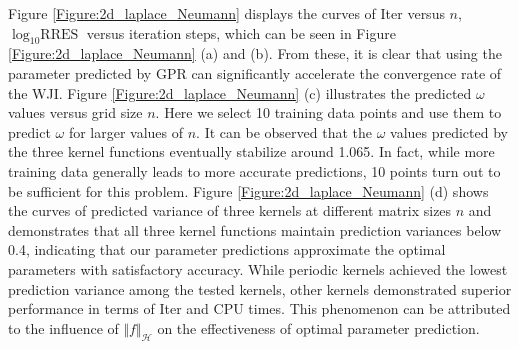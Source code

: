 \documentclass[preprint,review,sort&compress,3p]{elsarticle}
\begin{document}
Figure \ref{Figure:2d_laplace_Neumann} displays the curves of Iter versus $n$, $\log_{10} \text{RRES}$ versus iteration steps, which can be seen in Figure \ref{Figure:2d_laplace_Neumann} (a) and (b). {  From these, it is clear that using the parameter predicted by GPR can significantly accelerate the convergence rate of the WJI. Figure \ref{Figure:2d_laplace_Neumann} (c) illustrates the predicted $\omega$ values versus grid size $n$. Here we select 10 training data points and use them to predict $\omega$ for larger values of $n$. It can be observed that the $\omega$ values predicted by the three kernel functions eventually stabilize around 1.065. In fact, while more training data generally leads to more accurate predictions, 10 points turn out to be sufficient for this problem.}  Figure \ref{Figure:2d_laplace_Neumann} (d) shows the curves of predicted variance of three kernels at different matrix sizes $n$ and demonstrates that all three kernel functions maintain prediction variances below 0.4, indicating that our parameter predictions approximate the optimal parameters with satisfactory accuracy.
While periodic kernels achieved the lowest prediction variance among the tested kernels, other kernels demonstrated superior performance in terms of Iter and CPU times. This phenomenon can be attributed to the influence of $\Vert f\Vert_\mathcal{H}$ on the effectiveness of optimal parameter prediction.
\end{document}
